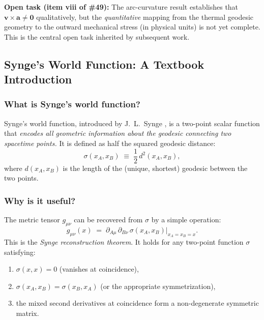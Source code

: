 \documentclass[12pt,letterpaper]{article}
\newcommand{\paperno}[1]{\textbf{\#{}#1}}
\begin{document}
\begin{mdframed}[style=openbox]
\textbf{Open task (item viii of \paperno{49}):}
The arc-curvature result establishes that $\mathbf{v}\times\mathbf{a}\neq\mathbf{0}$
qualitatively, but the \emph{quantitative} mapping from the thermal geodesic geometry
to the outward mechanical stress (in physical units) is not yet complete.
This is the central open task inherited by subsequent work.
\end{mdframed}

\subsection{Synge's World Function: A Textbook Introduction}
\label{subsec:synge}

\subsubsection{What is Synge's world function?}

Synge's world function, introduced by J.~L.~Synge \cite{Synge1960},
is a two-point scalar function that \emph{encodes all geometric information
about the geodesic connecting two spacetime points.}
It is defined as half the squared geodesic distance:
\begin{equation}
\sigma(x_A, x_B) \;\equiv\; \frac{1}{2}\,d^2(x_A, x_B),
\label{eq:synge_def}
\end{equation}
where $d(x_A, x_B)$ is the length of the (unique, shortest) geodesic between
the two points.

\subsubsection{Why is it useful?}

The metric tensor $g_{\mu\nu}$ can be recovered from $\sigma$ by a simple operation:
\begin{equation}
\boxed{g_{\mu\nu}(x) \;=\; \partial_{A\mu}\,\partial_{B\nu}\,\sigma(x_A, x_B) \Big|_{x_A = x_B = x}.}
\label{eq:synge_metric}
\end{equation}
This is the \emph{Synge reconstruction theorem}.
It holds for any two-point function $\sigma$ satisfying:
\begin{enumerate}[label=(\roman*), leftmargin=3em]
  \item $\sigma(x, x) = 0$ (vanishes at coincidence),
  \item $\sigma(x_A, x_B) = \sigma(x_B, x_A)$ (or the appropriate symmetrization),
  \item the mixed second derivatives at coincidence form a non-degenerate symmetric matrix.
\end{enumerate}
\end{document}
